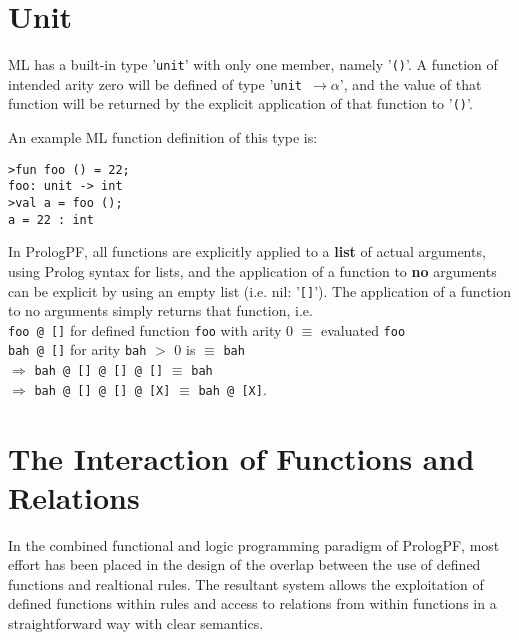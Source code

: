 \section{Unit} %
\label{unit}

ML has a built-in type '\texttt{unit}' with only one member, namely
 '\texttt{()}'.
A function of intended arity zero will be defined of type
'\texttt{unit $\rightarrow \alpha$}', and 
the value of that function will be returned by the explicit application
of that function to '\texttt{()}'.

An example ML function definition of this type is:
\begin{verbatim}
>fun foo () = 22;
foo: unit -> int
>val a = foo ();
a = 22 : int
\end{verbatim}
In PrologPF, all functions are explicitly applied to a \textbf{list} of
actual arguments, using Prolog syntax for lists, and the application of
a function to \textbf{no} arguments can be explicit by using an empty
list (i.e. nil: '\texttt{[]}').  The application of a function to no
arguments simply returns that function, i.e.\\
\texttt{foo @ []} for defined function \texttt{foo} with arity 0 $\equiv$ evaluated \texttt{foo}\\
\texttt{bah @ []} for arity \texttt{bah} $>$ 0 is $\equiv$ \texttt{bah}\\
$\Rightarrow$ \texttt{bah @ [] @ [] @ []} $\equiv$ \texttt{bah}\\
$\Rightarrow$ \texttt{bah @ [] @ [] @ [X]} $\equiv$ \texttt{bah @ [X]}.

\section{The Interaction of Functions and Relations} %

In the combined functional and logic programming paradigm of PrologPF, most
effort has been placed in the design of the overlap between the use of
defined functions and realtional rules.  The resultant system allows the
exploitation of defined functions within rules and access to relations from
within functions in a straightforward way with clear semantics.

